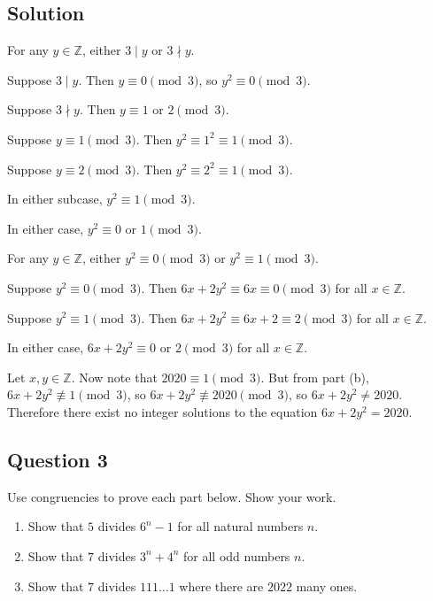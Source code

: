 \documentclass{article}
\begin{document}
\subsection*{Solution}
    \begin{enumerate}
        \item For any $y \in \mathbb{Z}$, either $3 \mid y$ or $3 \nmid y$.
        
        \begin{Cases}
            \item Suppose $3 \mid y$. Then $y \equiv 0 \pmod{3}$, so $y^{2} \equiv 0 \pmod{3}$.
            \item Suppose $3 \nmid y$. Then $y \equiv 1 \text{ or } 2 \pmod{3}$.
            
            \begin{Cases}[label* = \arabic*., itemindent = .6in, topsep = 0.04in]
                \item Suppose $y \equiv 1 \pmod{3}$. Then $y^{2} \equiv 1^2 \equiv 1 \pmod{3}$. 
                \item Suppose $y \equiv 2 \pmod{3}$. Then $y^{2} \equiv 2^{2} \equiv 1 \pmod{3}$.
            \end{Cases}
            In either subcase, $y^{2} \equiv 1 \pmod{3}$.
        \end{Cases}
        In either case, $y^{2} \equiv 0$ or $1 \pmod{3}$.
        \item For any $y \in \mathbb{Z}$, either $y^{2} \equiv 0 \pmod{3}$ or $y^{2} \equiv 1 \pmod{3}$.
        
        \begin{Cases}
            \item Suppose $y^{2} \equiv 0 \pmod{3}$. Then $6x + 2y^{2} \equiv 6x \equiv 0 \pmod{3}$ for all $x \in \mathbb{Z}$.
            \item Suppose $y^{2} \equiv 1 \pmod{3}$. Then $6x + 2y^{2} \equiv 6x + 2 \equiv 2 \pmod{3}$ for all $x \in \mathbb{Z}$.
        \end{Cases}
        In either case, $6x + 2y^2 \equiv 0$ or $2 \pmod{3}$ for all $x \in \mathbb{Z}$.
        \item Let $x, y \in \mathbb{Z}$. Now note that $2020 \equiv 1 \pmod{3}$. But from part (b), $6x + 2y^{2} \not\equiv 1 \pmod{3}$, so $6x + 2y^{2} \not\equiv 2020 \pmod{3}$, so $6x + 2y^{2} \ne 2020$. Therefore there exist no integer solutions to the equation $6x + 2y^{2} = 2020$.
    \end{enumerate}

\subsection*{Question 3}
    Use congruencies to prove each part below. Show your work.
    \begin{enumerate}
        \item Show that $5$ divides $6^{n} - 1$ for all natural numbers $n$.
        \item Show that $7$ divides $3^{n} + 4^{n}$ for all odd numbers $n$.
        \item Show that $7$ divides $111\dots1$ where there are $2022$ many ones.
    \end{enumerate}
\end{document}
